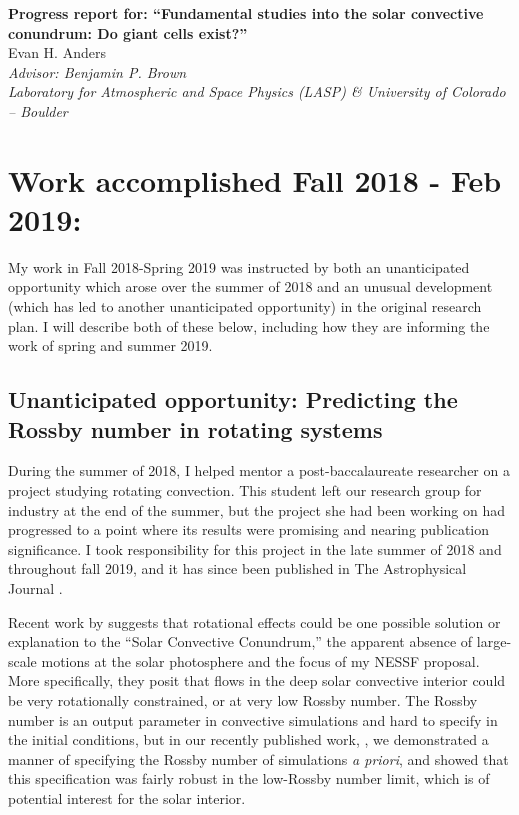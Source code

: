 \documentclass[aasms,12pt]{article}
\begin{document}
\begin{center}
   \large\textbf{Progress report for: ``Fundamental studies into the solar convective conundrum: Do giant cells exist?''}\\
   \vspace{0.2cm}
   \large{Evan H. Anders}\\
   \vspace{0.2cm}
   \normalsize\textit{Advisor: Benjamin P. Brown}\\
   \normalsize\textit{Laboratory for Atmospheric and Space Physics (LASP) \& University of Colorado -- Boulder}\\
\end{center}

\vspace{-0.6cm}
\section{Work accomplished Fall 2018 - Feb 2019:}
My work in Fall 2018-Spring 2019 was instructed by both an unanticipated opportunity which arose over the
summer of 2018 and an unusual development (which has led to another unanticipated opportunity)
in the original research plan. I will describe both 
of these below, including how they are informing the work of spring and summer 2019.

\subsection{Unanticipated opportunity: Predicting the Rossby number in rotating systems}
During the summer of 2018, I helped mentor a post-baccalaureate researcher on a project
studying rotating convection. This student left our research group for industry at the end of
the summer, but the project she had been working on had progressed to a point where
its results were promising and nearing publication significance. I took responsibility for
this project in the late summer of 2018 and throughout fall 2019, and it has since been published
in The Astrophysical Journal \citep{anders&all2019}.

Recent work by \cite{featherstone&hindman2016} suggests that rotational effects could be
one possible solution or explanation
to the ``Solar Convective Conundrum,'' the apparent absence of large-scale motions at the
solar photosphere and the focus of my NESSF proposal. More specifically, they posit that flows
in the deep solar convective interior could be very rotationally constrained, or at very low
Rossby number. The Rossby number is an output parameter in convective simulations and hard
to specify in the initial conditions, but in our recently published work, \citet{anders&all2019}, 
we demonstrated a manner of specifying the Rossby number of simulations \emph{a priori},
and showed that this specification was fairly robust in the low-Rossby number limit, which
is of potential interest for the solar interior.
\end{document}
